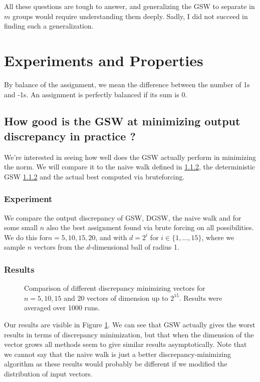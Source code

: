 \documentclass[12pt]{article}
\begin{document}
All these questions are tough to answer, and generalizing the GSW to separate in $m$ groups would require understanding them deeply. Sadly, I did not succeed in finding such a generalization.

\section{Experiments and Properties}
By balance of the assignment, we mean the difference between the number of 1s and -1s. An assignment is perfectly balanced if its sum is 0.

\subsection{How good is the GSW at minimizing output discrepancy in practice ?}
We're interested in seeing how well does the GSW actually perform in minimizing the norm. We will compare it to the naive walk defined in \ref{}, the deterministic GSW \ref{} and the actual best computed via bruteforcing.

\subsubsection{Experiment}\label{how_good_at_minimizing_disc}
We compare the output discrepancy of GSW, DGSW, the naive walk and for some small $n$ also the best assignment found via brute forcing on all possibilities. We do this for$n=5,10,15,20$, and with $d=2^i$ for $i\in\{1,\dots,15\}$, where we sample $n$ vectors from the $d$-dimensional ball of radius 1.

\subsubsection{Results}
\begin{figure}
\centering

\caption{Comparison of different discrepancy minimizing vectors for $n=5,10,15$ and $20$ vectors of dimension up to $2^{15}$. Results were averaged over 1000 runs.}\label{output_disc}
\end{figure}
Our results are visible in Figure \ref{output_disc}. We can see that GSW actually gives the worst results in terms of discrepancy minimization, but that when the dimension of the vector grows all methods seem to give similar results asymptotically. Note that we cannot say that the naive walk is just a better discrepancy-minimizing algorithm as these results would probably be different if we modified the distribution of input vectors.
\end{document}
